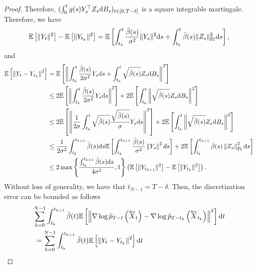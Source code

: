 \documentclass[english,graybox,envcountchap,envcountsame,sectrefs,shortlabels]{svmono}
\theoremstyle{style}
\newcommand{\eqsp}{}
\begin{document}
\begin{proof}
Therefore, $( \int_0^t g(s) Y_s^\top Z_s \mathrm{d} B_s )_{t \in [0,T-\delta]}$ is a square integrable martingale. Therefore, we have
\begin{align*}
\mathbb{E} \left[ \|Y_t\|^2 \right] - \mathbb{E} \left[ \|Y_{t_k}\|^2 \right] = \mathbb{E} \left[\int_{t_k}^t \frac{\bar \sched (s)}{\sigma^2} \|Y_s\|^2  \rmd s+ \int_{t_k}^t \bar \sched (s) \|Z_s\|_{\mathrm{Fr}}^2  \rmd s \right]\eqsp,
\end{align*}
and
\begin{align}
    \mathbb{E} \left[ \left\|  Y_t -  Y_{t_k} \right\|^2 \right] &=  \mathbb{E} \left[ \left\|  \int_{t_k}^t \frac{ \bar \sched(s)}{2 \sigma^2} Y_s \rmd s + \int_{t_k}^t \sqrt{\bar \sched(s)} Z_s \rmd B_s \right\|^2 \right]
    \notag\\
    & \leq 2 \mathbb{E} \left[ \left\|  \int_{t_k}^{t} \frac{ \bar \sched(s)}{2 \sigma^2} Y_s \rmd s \right\|^2  \right] +2 \mathbb{E} \left[ \int_{t_k}^{t} \left\| \sqrt{\bar \sched(s)} Z_s \rmd B_s \right\|^2 \right]
    \notag\\
    & \leq 2 \mathbb{E} \left[ \left\|  \frac{1}{2 \sigma} \int_{t_k}^{t} \sqrt{\bar \sched(s)} \frac{ \sqrt{\bar \sched(s)}}{ \sigma} Y_s \rmd s \right\|^2  \right] +2 \mathbb{E} \left[ \int_{t_k}^{t} \left\| \sqrt{\bar \sched(s)} Z_s \rmd B_s \right\|^2 \right]
    \notag\\
    & \leq \frac{1}{2 \sigma^2} \int_{t_k}^{t_{k +1}} \bar \sched (s) \rmd s \mathbb{E} \left[ \int_{t_k}^{t_{k +1}} \frac{\bar \sched(s)}{\sigma^2}  \left\|  Y_s \right\|^2 ds  \right] + 2 \mathbb{E} \left[  \int_{t_k}^{t_{k +1}} \bar \sched (s) \left\| Z_s \right\|^2_{\mathrm{Fr}} \rmd s \right] 
    \notag\\
    & \leq 2 \max \left\{ \frac{\int_{t_k}^{t_{k +1}} \bar \sched (s) \rmd s}{ 4 \sigma^2} , 1 \right\} \left( \mathbb{E} \left[ \|Y_{t_{k+1}}\|^2 \right] - \mathbb{E} \left[ \|Y_{t_k}\|^2 \right] \right)\eqsp. \label{eq:lemmaA3:ineq-telescopic}
\end{align}
Without loss of generality, we have that $t_{N-1} = T-\delta$.
Then, the discretization error can be bounded as follows
\begin{align*}
    &\sum_{k = 0}^{N-1} \int_{t_k}^{t_{k+1}} \bar \sched (t) \mathbb{E} \left[  \left\|   \nabla \log \tilde p_{T-t}\left(\ola X_t\right) - \nabla \log \tilde p_{T-t_k}\left(\ola X_{t_k}\right) \right\|^2 \right] \rmd t
    \\
    &\hspace{.1cm}= 
    \sum_{k = 0}^{N-1} \int_{t_k}^{t_{k+1}} \bar \sched (t) \mathbb{E} \left[  \left\|   Y_t - Y_{t_k} \right\|^2 \right] \rmd t

\end{align*}
\end{proof}
\end{document}
